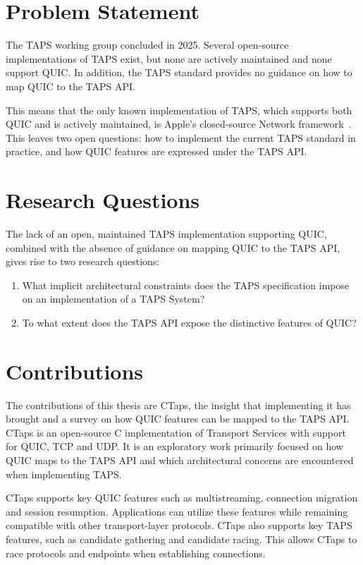 \section{Problem Statement}\label{sec:prob-statement}
The TAPS working group concluded in 2025. Several open-source implementations of TAPS exist,
but none are actively maintained and none support QUIC. In addition, the TAPS standard provides no
guidance on how to map QUIC to the TAPS API.

This means that the only known implementation of TAPS, which supports both QUIC and
is actively maintained, is Apple's closed-source Network framework~\cite{networkFramework}.
This leaves two open questions: how to implement the current TAPS standard in practice,
and how QUIC features are expressed under the TAPS API.

\section{Research Questions}
The lack of an open, maintained TAPS implementation supporting QUIC,
combined with the absence of guidance on mapping QUIC to the TAPS API,
gives rise to two research questions:

\newcommand{\rqone}{What implicit architectural constraints does the TAPS specification impose on an implementation of a TAPS System?}
\newcommand{\rqtwo}{To what extent does the TAPS API expose the distinctive features of QUIC?}

\begin{enumerate}
    \item \rqone
    \item \rqtwo
\end{enumerate}

\section{Contributions}
The contributions of this thesis are CTaps, the insight that implementing
it has brought and a survey on how QUIC features can be mapped
to the TAPS API.
CTaps is an open-source C implementation of Transport Services with support
for QUIC, TCP and UDP. It is an exploratory work primarily
focused on how QUIC maps to the TAPS API and which
architectural concerns are encountered when implementing TAPS.

CTaps supports key QUIC features such as multistreaming, connection migration and session resumption.
Applications can utilize these features while remaining compatible with other
transport-layer protocols. CTaps also supports key TAPS features, such as candidate
gathering and candidate racing. This allows CTaps to race protocols and endpoints when
establishing connections.

